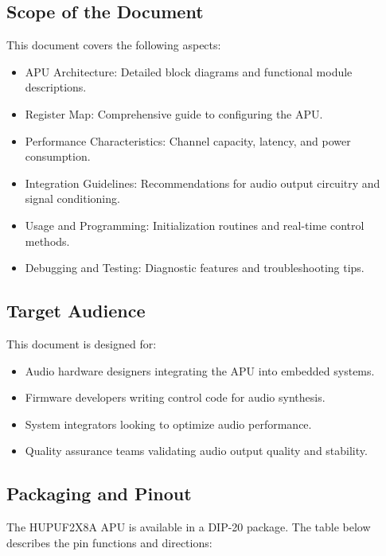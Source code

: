 \subsection{Scope of the Document}

This document covers the following aspects:
\begin{itemize}
    \item APU Architecture: Detailed block diagrams and functional module descriptions.
    \item Register Map: Comprehensive guide to configuring the APU.
    \item Performance Characteristics: Channel capacity, latency, and power consumption.
    \item Integration Guidelines: Recommendations for audio output circuitry and signal conditioning.
    \item Usage and Programming: Initialization routines and real-time control methods.
    \item Debugging and Testing: Diagnostic features and troubleshooting tips.
\end{itemize}

\subsection{Target Audience}

This document is designed for:
\begin{itemize}
    \item Audio hardware designers integrating the APU into embedded systems.
    \item Firmware developers writing control code for audio synthesis.
    \item System integrators looking to optimize audio performance.
    \item Quality assurance teams validating audio output quality and stability.
\end{itemize}

\subsection{Packaging and Pinout}

The HUPUF2X8A APU is available in a DIP-20 package. The table below describes the pin functions and directions:

